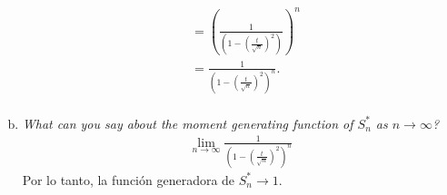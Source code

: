 \documentclass{article}
\begin{document}
\begin{enumerate}[a)]
\begin{align}
                & = \left(\frac{1}{\left(1-\left(\frac{t}{\sqrt{n}}\right)^2\right)} \right)^n \\ \nonumber
                & = \frac{1}{\left(1-\left(\frac{t}{\sqrt{n}}\right)^2\right)^n}.  \\ \nonumber
    \end{align}
    \item \textit{What can you say about the moment generating function of $S_{n}^{*}$ as $n \longrightarrow \infty$?}
        \begin{align}
        \nonumber
        \lim_{n \to \infty}\frac{1}{\left(1-\left(\frac{t}{\sqrt{n}}\right)^2\right)^n}\nonumber
    \end{align}
Por lo tanto, la función generadora de  $S_{n}^{*} \longrightarrow 1$.
\end{enumerate}





\end{document}
